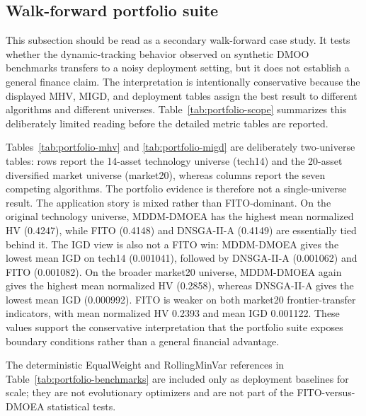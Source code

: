 \documentclass[preprint,12pt]{elsarticle}
\begin{document}
\subsection{Walk-forward portfolio suite}

This subsection should be read as a secondary walk-forward case study. It tests whether the dynamic-tracking behavior observed on synthetic DMOO benchmarks transfers to a noisy deployment setting, but it does not establish a general finance claim. The interpretation is intentionally conservative because the displayed MHV, MIGD, and deployment tables assign the best result to different algorithms and different universes. Table~\ref{tab:portfolio-scope} summarizes this deliberately limited reading before the detailed metric tables are reported.







Tables~\ref{tab:portfolio-mhv} and \ref{tab:portfolio-migd} are deliberately two-universe tables: rows report the 14-asset technology universe (tech14) and the 20-asset diversified market universe (market20), whereas columns report the seven competing algorithms. The portfolio evidence is therefore not a single-universe result. The application story is mixed rather than FITO-dominant. On the original technology universe, MDDM-DMOEA has the highest mean normalized HV (0.4247), while FITO (0.4148) and DNSGA-II-A (0.4149) are essentially tied behind it. The IGD view is also not a FITO win: MDDM-DMOEA gives the lowest mean IGD on tech14 (0.001041), followed by DNSGA-II-A (0.001062) and FITO (0.001082). On the broader market20 universe, MDDM-DMOEA again gives the highest mean normalized HV (0.2858), whereas DNSGA-II-A gives the lowest mean IGD (0.000992). FITO is weaker on both market20 frontier-transfer indicators, with mean normalized HV 0.2393 and mean IGD 0.001122. These values support the conservative interpretation that the portfolio suite exposes boundary conditions rather than a general financial advantage.





The deterministic EqualWeight and RollingMinVar references in Table~\ref{tab:portfolio-benchmarks} are included only as deployment baselines for scale; they are not evolutionary optimizers and are not part of the FITO-versus-DMOEA statistical tests.
\end{document}
